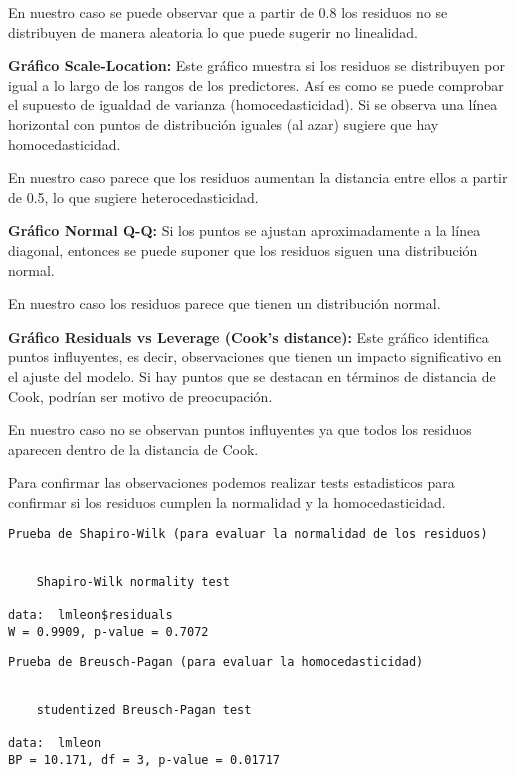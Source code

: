\documentclass[
]{article}
\begin{document}
En nuestro caso se puede observar que a partir de 0.8 los residuos no se
distribuyen de manera aleatoria lo que puede sugerir no linealidad.

\textbf{Gráfico Scale-Location:} Este gráfico muestra si los residuos se
distribuyen por igual a lo largo de los rangos de los predictores. Así
es como se puede comprobar el supuesto de igualdad de varianza
(homocedasticidad). Si se observa una línea horizontal con puntos de
distribución iguales (al azar) sugiere que hay homocedasticidad.

En nuestro caso parece que los residuos aumentan la distancia entre
ellos a partir de 0.5, lo que sugiere heterocedasticidad.

\textbf{Gráfico Normal Q-Q:} Si los puntos se ajustan aproximadamente a
la línea diagonal, entonces se puede suponer que los residuos siguen una
distribución normal.

En nuestro caso los residuos parece que tienen un distribución normal.

\textbf{Gráfico Residuals vs Leverage (Cook's distance):} Este gráfico
identifica puntos influyentes, es decir, observaciones que tienen un
impacto significativo en el ajuste del modelo. Si hay puntos que se
destacan en términos de distancia de Cook, podrían ser motivo de
preocupación.

En nuestro caso no se observan puntos influyentes ya que todos los
residuos aparecen dentro de la distancia de Cook.

Para confirmar las observaciones podemos realizar tests estadisticos
para confirmar si los residuos cumplen la normalidad y la
homocedasticidad.

\begin{verbatim}
Prueba de Shapiro-Wilk (para evaluar la normalidad de los residuos)
\end{verbatim}

\begin{verbatim}

    Shapiro-Wilk normality test

data:  lmleon$residuals
W = 0.9909, p-value = 0.7072
\end{verbatim}

\begin{verbatim}
Prueba de Breusch-Pagan (para evaluar la homocedasticidad)
\end{verbatim}

\begin{verbatim}

    studentized Breusch-Pagan test

data:  lmleon
BP = 10.171, df = 3, p-value = 0.01717
\end{verbatim}
\end{document}
